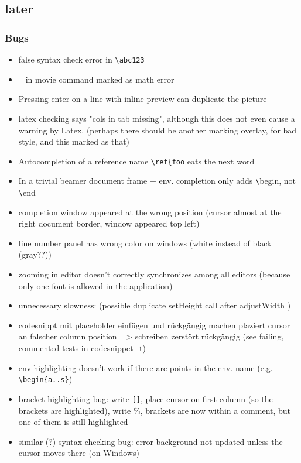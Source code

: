 \documentclass[10pt,a4paper,landscape]{report}
\begin{document}
\subsection{later}

\subsubsection{Bugs}
\begin{itemize}
\item false syntax check error in \verb+\abc123+
\item \verb+_+ in movie command marked as math error
\item Pressing enter on a line with inline preview can duplicate the picture
\item latex checking says "cols in tab missing", although this does not even cause a warning by Latex. (perhaps there should be another marking overlay, for bad style, and this marked as that)
\item Autocompletion of a reference name \verb+\ref{foo+ eats the next word
\item In a trivial beamer document frame + env. completion only adds \verb+\+begin, not \verb+\+end
\item completion window appeared at the wrong position (cursor almost at the right document border, window appeared top left)
\item line number panel has wrong color on windows (white instead of black (gray??)) 
\item zooming in editor doesn't correctly synchronizes among all editors (because only one font is allowed in the application)
\item unnecessary slowness: (possible duplicate setHeight call after adjustWidth )
\item codesnippt mit placeholder einfügen und rückgängig machen plaziert cursor an falscher column position => schreiben zerstört rückgängig (see failing, commented tests in codesnippet\_t)
\item  env highlighting doesn't work if there are points in the env. name (e.g. \verb+\begin{a..s}+)
\item bracket highlighting bug: write \verb+[]+, place cursor on first column (so the brackets are highlighted), write \%, brackets are now within a comment, but one of them is still highlighted
\item similar (?) syntax checking bug: error background not updated unless the cursor moves there (on Windows)

\end{itemize}
\end{document}
